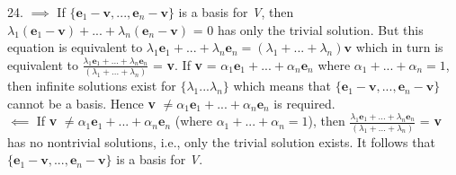 \documentclass{article}
\begin{document}
    24. $\implies$ If $\{\textbf{e}_1 - \textbf{v}, ..., \textbf{e}_n - \textbf{v}\}$ is a basis for \textit{V}, then $\lambda_1(\textbf{e}_1 - \textbf{v}) + ... + \lambda_n(\textbf{e}_n - \textbf{v})$ = 0 has only the trivial solution. But this equation is equivalent to $\lambda_1\textbf{e}_1 + ... + \lambda_n\textbf{e}_n = (\lambda_1 + ... + \lambda_n)\textbf{v}$ which in turn is equivalent to $\frac{\lambda_1\textbf{e}_1 + ... + \lambda_n\textbf{e}_n}{(\lambda_1 + ... + \lambda_n)}$ = \textbf{v}. If \textbf{v} = $\alpha_1\textbf{e}_1 + ... + \alpha_n\textbf{e}_n$ where $\alpha_1 + ... + \alpha_n = 1$, then infinite solutions exist for $\{\lambda_1 ... \lambda_n\}$ which means that $\{\textbf{e}_1 - \textbf{v}, ..., \textbf{e}_n - \textbf{v}\}$ cannot be a basis. Hence \textbf{v} $\neq \alpha_1\textbf{e}_1 + ... + \alpha_n\textbf{e}_n$ is required.\\
  $\impliedby$ If \textbf{v} $\neq \alpha_1\textbf{e}_1 + ... + \alpha_n\textbf{e}_n$ (where $\alpha_1 + ... + \alpha_n = 1$), then $\frac{\lambda_1\textbf{e}_1 + ... + \lambda_n\textbf{e}_n}{(\lambda_1 + ... + \lambda_n)}$ = \textbf{v} has no nontrivial solutions, i.e., only the trivial solution exists. It follows that $\{\textbf{e}_1 - \textbf{v}, ..., \textbf{e}_n - \textbf{v}\}$ is a basis for \textit{V}.
\end{document}
